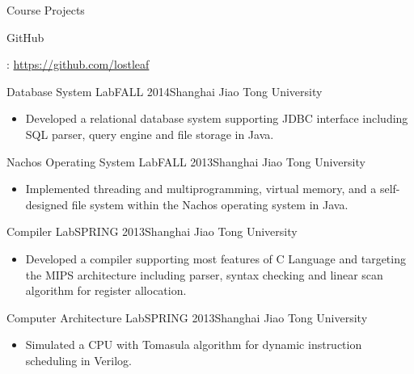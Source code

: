 \documentclass{resume} %
\begin{document}
\begin{rSection}{Course Projects}{\begin{bf}GitHub\end{bf}: \href{https://github.com/lostleaf?tab=repositories}{https://github.com/lostleaf}}

\begin{rSubsection}{Database System Lab}{FALL 2014}{Shanghai Jiao Tong University}
\begin{itemize}
\item Developed a relational database system supporting JDBC interface including SQL parser, query engine and file storage in Java.
\end{itemize}
\end{rSubsection}
\vspace{3pt}
\begin{rSubsection}{Nachos Operating System Lab}{FALL 2013}{Shanghai Jiao Tong University}
\begin{itemize}
\item Implemented threading and multiprogramming, virtual memory, and a self-designed file system within the Nachos operating system in Java.
\end{itemize}
\end{rSubsection}
\vspace{3pt}
\begin{rSubsection}{Compiler Lab}{SPRING 2013}{Shanghai Jiao Tong University}
\begin{itemize}
\item Developed a compiler supporting most features of C Language and targeting the MIPS architecture including parser, syntax checking and linear scan algorithm for register allocation.
\end{itemize}
\end{rSubsection}
\vspace{3pt}
\begin{rSubsection}{Computer Architecture Lab}{SPRING 2013}{Shanghai Jiao Tong University}
\begin{itemize}
\item Simulated a CPU with Tomasula algorithm for dynamic instruction scheduling in Verilog.
\end{itemize}
\end{rSubsection}

\end{rSection}
\vspace{10pt}




\end{document}
